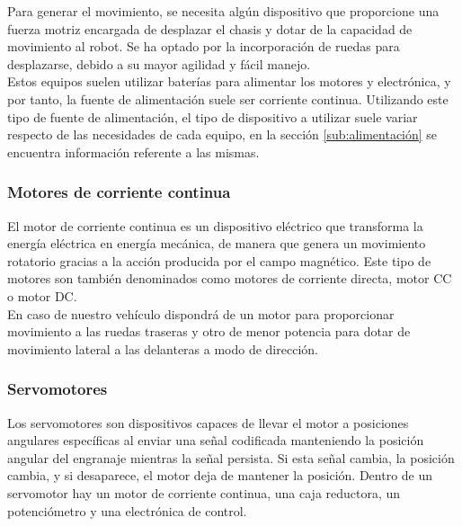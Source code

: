 Para generar el movimiento, se necesita algún dispositivo que proporcione una fuerza motriz encargada de desplazar el chasis y dotar de la capacidad de movimiento al robot.
Se ha optado por la incorporación de ruedas para desplazarse, debido a su mayor agilidad y fácil manejo.\\

Estos equipos suelen utilizar baterías para alimentar los motores y electrónica, y por tanto, la fuente de alimentación suele ser corriente continua. Utilizando este tipo de
fuente de alimentación, el tipo de dispositivo a utilizar suele variar respecto de las necesidades de cada equipo, en la sección \ref{sub:alimentación} se encuentra información
referente a las mismas.\\

\subsubsection{Motores de corriente continua}

El motor de corriente continua es un dispositivo eléctrico que transforma la energía eléctrica en energía mecánica, de manera que genera un movimiento rotatorio gracias a la  
acción producida por el campo magnético. Este tipo de motores son también denominados como motores de corriente directa, motor CC o motor DC.\\

En caso de nuestro vehículo dispondrá de un motor para proporcionar movimiento a las ruedas traseras y otro de menor potencia para dotar de movimiento lateral a las delanteras 
a modo de dirección.\\

\subsubsection{Servomotores}

Los servomotores son dispositivos capaces de llevar el motor a posiciones angulares específicas al enviar una señal codificada manteniendo la  posición  angular  del  engranaje
mientras la señal persista. Si esta señal cambia, la posición cambia, y si desaparece, el motor deja de mantener la posición. Dentro de un servomotor hay un motor de corriente
continua, una caja reductora, un potenciómetro y una electrónica de control.\\

